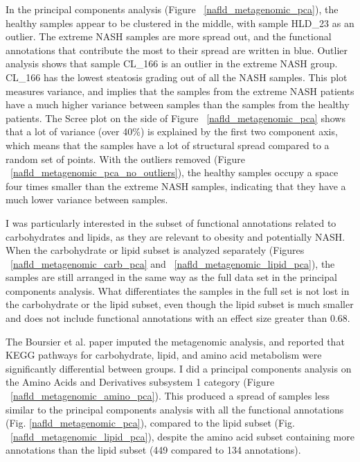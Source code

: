 In the principal components analysis (Figure ~\ref{nafld_metagenomic_pca}), the healthy samples appear to be clustered in the middle, with sample HLD\_23 as an outlier. The extreme NASH samples are more spread out, and the functional annotations that contribute the most to their spread are written in blue. Outlier analysis shows that sample CL\_166 is an outlier in the extreme NASH group. CL\_166 has the lowest steatosis grading out of all the NASH samples. This plot measures variance, and implies that the samples from the extreme NASH patients have a much higher variance between samples than the samples from the healthy patients. The Scree plot on the side of Figure ~\ref{nafld_metagenomic_pca} shows that a lot of variance (over 40\%) is explained by the first two component axis, which means that the samples have a lot of structural spread compared to a random set of points. With the outliers removed (Figure ~\ref{nafld_metagenomic_pca_no_outliers}), the healthy samples occupy a space four times smaller than the extreme NASH samples, indicating that they have a much lower variance between samples.

I was particularly interested in the subset of functional annotations related to carbohydrates and lipids, as they are relevant to obesity and potentially NASH. When the carbohydrate or lipid subset is analyzed separately (Figures ~\ref{nafld_metagenomic_carb_pca} and ~\ref{nafld_metagenomic_lipid_pca}), the samples are still arranged in the same way as the full data set in the principal components analysis. What differentiates the samples in the full set is not lost in the carbohydrate or the lipid subset, even though the lipid subset is much smaller and does not include functional annotations with an effect size greater than 0.68.

The Boursier et al. \cite{boursier2016severity} paper imputed the metagenomic analysis, and reported that KEGG pathways for carbohydrate, lipid, and amino acid metabolism were significantly differential between groups. I did a principal components analysis on the Amino Acids and Derivatives subsystem 1 category (Figure ~\ref{nafld_metagenomic_amino_pca}). This produced a spread of samples less similar to the principal components analysis with all the functional annotations (Fig. \ref{nafld_metagenomic_pca}), compared to the lipid subset (Fig. ~\ref{nafld_metagenomic_lipid_pca}), despite the amino acid subset containing more annotations than the lipid subset (449 compared to 134 annotations).

